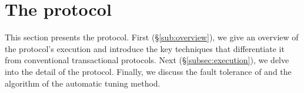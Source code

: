 \section{The \specula protocol}
\label{sec:protocol}
This section presents the \specula protocol. First (\S \ref{sub:overview}), we give an overview of the protocol's execution and introduce the key techniques that differentiate it from conventional transactional protocols. Next (\S \ref{subsec:execution}), we delve into the detail of the protocol. Finally, we discuss the fault tolerance of \specula and the algorithm of the automatic tuning method.

